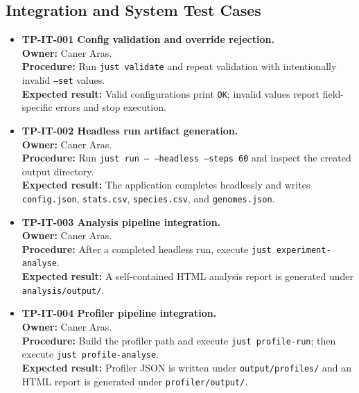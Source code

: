 \subsection{Integration and System Test Cases}

\begin{itemize}[leftmargin=*]
	\item \textbf{TP-IT-001 Config validation and override rejection.}\\
	      \textbf{Owner:} Caner Aras.\\
	      \textbf{Procedure:} Run \texttt{just validate} and repeat validation with intentionally
	      invalid \texttt{--set} values.\\
	      \textbf{Expected result:} Valid configurations print \texttt{OK}; invalid values report
	      field-specific errors and stop execution.

	\item \textbf{TP-IT-002 Headless run artifact generation.}\\
	      \textbf{Owner:} Caner Aras.\\
	      \textbf{Procedure:} Run \texttt{just run -- --headless --steps 60} and inspect the
	      created output directory.\\
	      \textbf{Expected result:} The application completes headlessly and writes
	      \texttt{config.json}, \texttt{stats.csv}, \texttt{species.csv}, and
	      \texttt{genomes.json}.

	\item \textbf{TP-IT-003 Analysis pipeline integration.}\\
	      \textbf{Owner:} Caner Aras.\\
	      \textbf{Procedure:} After a completed headless run, execute
	      \texttt{just experiment-analyse}.\\
	      \textbf{Expected result:} A self-contained HTML analysis report is generated under
	      \texttt{analysis/output/}.

	\item \textbf{TP-IT-004 Profiler pipeline integration.}\\
	      \textbf{Owner:} Caner Aras.\\
	      \textbf{Procedure:} Build the profiler path and execute \texttt{just profile-run}; then
	      execute \texttt{just profile-analyse}.\\
	      \textbf{Expected result:} Profiler JSON is written under \texttt{output/profiles/} and
	      an HTML report is generated under \texttt{profiler/output/}.


\end{itemize}
